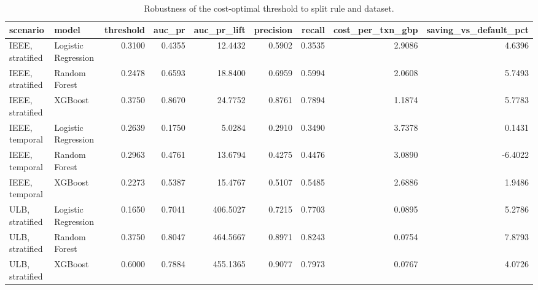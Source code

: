 \begin{table}
\caption{Robustness of the cost-optimal threshold to split rule and dataset.}
\label{tab:table3_robustness}
\begin{tabular}{llrrrrrrr}
\toprule
scenario & model & threshold & auc\_pr & auc\_pr\_lift & precision & recall & cost\_per\_txn\_gbp & saving\_vs\_default\_pct \\
\midrule
IEEE, stratified & Logistic Regression & 0.3100 & 0.4355 & 12.4432 & 0.5902 & 0.3535 & 2.9086 & 4.6396 \\
IEEE, stratified & Random Forest & 0.2478 & 0.6593 & 18.8400 & 0.6959 & 0.5994 & 2.0608 & 5.7493 \\
IEEE, stratified & XGBoost & 0.3750 & 0.8670 & 24.7752 & 0.8761 & 0.7894 & 1.1874 & 5.7783 \\
IEEE, temporal & Logistic Regression & 0.2639 & 0.1750 & 5.0284 & 0.2910 & 0.3490 & 3.7378 & 0.1431 \\
IEEE, temporal & Random Forest & 0.2963 & 0.4761 & 13.6794 & 0.4275 & 0.4476 & 3.0890 & -6.4022 \\
IEEE, temporal & XGBoost & 0.2273 & 0.5387 & 15.4767 & 0.5107 & 0.5485 & 2.6886 & 1.9486 \\
ULB, stratified & Logistic Regression & 0.1650 & 0.7041 & 406.5027 & 0.7215 & 0.7703 & 0.0895 & 5.2786 \\
ULB, stratified & Random Forest & 0.3750 & 0.8047 & 464.5667 & 0.8971 & 0.8243 & 0.0754 & 7.8793 \\
ULB, stratified & XGBoost & 0.6000 & 0.7884 & 455.1365 & 0.9077 & 0.7973 & 0.0767 & 4.0726 \\
\bottomrule
\end{tabular}
\end{table}
